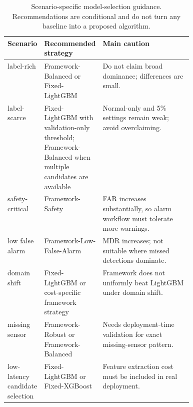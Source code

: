\begin{table}[!htbp]
\centering
\scriptsize
\setlength{\tabcolsep}{3pt}
\renewcommand{\arraystretch}{1.16}
\caption{Scenario-specific model-selection guidance. Recommendations are conditional and do not turn any baseline into a proposed algorithm.}
\label{tab:model-selection-guidance}
\begin{tabularx}{\linewidth}{@{}>{\RaggedRight\arraybackslash}p{0.14\linewidth}>{\RaggedRight\arraybackslash}p{0.29\linewidth}>{\RaggedRight\arraybackslash}X@{}}
\toprule
Scenario & Recommended strategy & Main caution \\
\midrule
label-rich & Framework-Balanced or Fixed-LightGBM & Do not claim broad dominance; differences are small. \\
label-scarce & Fixed-LightGBM with validation-only threshold; Framework-Balanced when multiple candidates are available & Normal-only and 5\% settings remain weak; avoid overclaiming. \\
safety-critical & Framework-Safety & FAR increases substantially, so alarm workflow must tolerate more warnings. \\
low false alarm & Framework-Low-False-Alarm & MDR increases; not suitable where missed detections dominate. \\
domain shift & Fixed-LightGBM or cost-specific framework strategy & Framework does not uniformly beat LightGBM under domain shift. \\
missing sensor & Framework-Robust or Framework-Balanced & Needs deployment-time validation for exact missing-sensor pattern. \\
low-latency candidate selection & Fixed-LightGBM or Fixed-XGBoost & Feature extraction cost must be included in real deployment. \\
\bottomrule
\end{tabularx}
\end{table}
